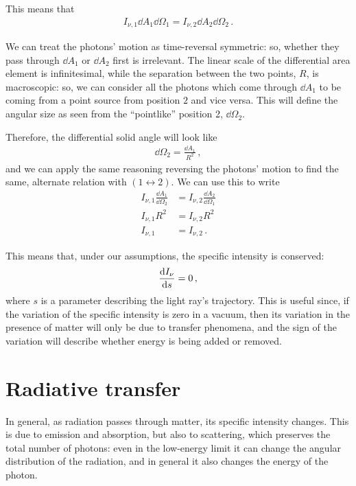 \documentclass[main.tex]{subfiles}
\begin{document}
This means that 
%
\begin{align}
I_{\nu, 1} \dd{A_1 } \dd{\Omega_1 } = 
I_{\nu, 2} \dd{A_2 } \dd{\Omega_2 }
\,.
\end{align}
%

We can treat the photons' motion as time-reversal symmetric: so, whether they pass through \(\dd{A_1 }\) or \(\dd{A_2 }\) first is irrelevant. 
The linear scale of the differential area element is infinitesimal, while the separation between the two points, \(R\), is macroscopic: so, we can consider all the photons which come through \(\dd{A_1}\) to be coming from a point source from position \(2\) and vice versa.
This will define the angular size as seen from the ``pointlike'' position 2, \(\dd{\Omega_2 }\).
 
Therefore, the differential solid angle will look like 
%
\begin{align}
\dd{\Omega_2 } = \frac{ \dd{A_1 } }{R^2}
\,,
\end{align}
%
and we can apply the same reasoning reversing the photons' motion to find the same, alternate relation with \((1 \leftrightarrow 2)\). 
We can use this to write 
%
\begin{subequations}
\begin{align}
I_{\nu , 1} \frac{ \dd{A_1 }}{ \dd{\Omega_2 }} &= 
I_{\nu , 2} \frac{ \dd{A_2 }}{ \dd{\Omega_1 }}  \\
I_{\nu ,1 } R^2 &= I_{\nu , 2} R^2  \\
I_{\nu , 1} &= I_{\nu , 2}
\,.
\end{align}
\end{subequations}

This means that, under our assumptions, the specific intensity is conserved: 
%
\begin{align}
\dv{I_{\nu }}{s} = 0
\,,
\end{align}
%
where \(s\) is a parameter describing the light ray's trajectory.
This is useful since, if the variation of the specific intensity is zero in a vacuum, then its variation in the presence of matter will only be due to transfer phenomena, and the sign of the variation will describe whether energy is being added or removed. 

\section{Radiative transfer}

In general, as radiation passes through matter, its specific intensity changes.
This is due to emission and absorption, but also to scattering, which preserves the total number of photons: even in the low-energy limit it can change the angular distribution of the radiation, and in general it also changes the energy of the photon.
\end{document}
